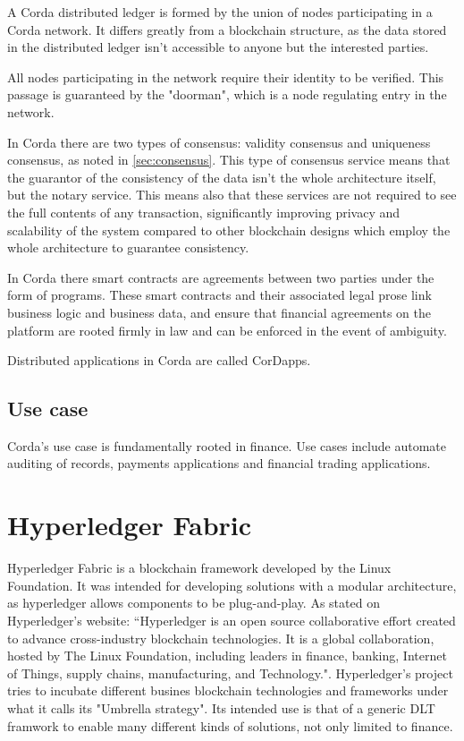 A Corda distributed ledger is formed by the union of nodes participating in a Corda network. It differs greatly from a blockchain structure, as the data stored in the distributed ledger isn't accessible to anyone but the interested parties. 

All nodes participating in the network require their identity to be verified. This passage is guaranteed by the "doorman", which is a node regulating entry in the network.

In Corda there are two types of consensus: validity consensus and uniqueness consensus, as noted in \ref{sec:consensus}. This type of consensus service means that the guarantor of the consistency of the data isn't the whole architecture itself, but the notary service. This means also that these services are not required to see the full contents of any transaction, significantly improving privacy and scalability of the system compared to other blockchain designs which employ the whole architecture to guarantee consistency.

In Corda there smart contracts are agreements between two parties under the form of programs. These smart contracts and their associated legal prose link business logic and business data, and ensure that financial agreements on the platform are rooted firmly in law and can be enforced in the event of ambiguity.

Distributed applications in Corda are called CorDapps.

\subsection{Use case}

Corda's use case is fundamentally rooted in finance. Use cases include automate auditing of records, payments applications and financial trading applications.

\section{Hyperledger Fabric}

Hyperledger Fabric is a blockchain framework developed by the Linux Foundation. It was intended for developing solutions with a modular architecture, as hyperledger allows components to be plug-and-play. As stated on Hyperledger's website: “Hyperledger is an open source collaborative effort created to advance cross-industry blockchain technologies. It is a global collaboration, hosted by The Linux Foundation, including leaders in finance, banking, Internet of Things, supply chains, manufacturing, and Technology.".
Hyperledger's project tries to incubate different busines blockchain technologies and frameworks under what it calls its "Umbrella strategy". Its intended use is that of a generic DLT framwork to enable many different kinds of solutions, not only limited to finance.

